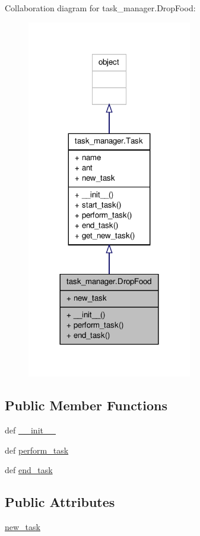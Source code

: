 Collaboration diagram for task\+\_\+manager.\+Drop\+Food\+:\nopagebreak
\begin{figure}[H]
\begin{center}
\leavevmode
\includegraphics[width=204pt]{classtask__manager_1_1DropFood__coll__graph}
\end{center}
\end{figure}
\subsection*{Public Member Functions}
\begin{DoxyCompactItemize}
\item 
def \hyperlink{classtask__manager_1_1DropFood_a0f759e307357de441edd8465313ca4e8}{\+\_\+\+\_\+init\+\_\+\+\_\+}
\item 
def \hyperlink{classtask__manager_1_1DropFood_a82661a2394895191b28bb7ac1aeb5bf4}{perform\+\_\+task}
\item 
def \hyperlink{classtask__manager_1_1DropFood_aedccf366d55d4b081239ff27b72d896d}{end\+\_\+task}
\end{DoxyCompactItemize}
\subsection*{Public Attributes}
\begin{DoxyCompactItemize}
\item 
\hyperlink{classtask__manager_1_1DropFood_a9c3891af721254b73254732f0cb18f59}{new\+\_\+task}
\end{DoxyCompactItemize}


